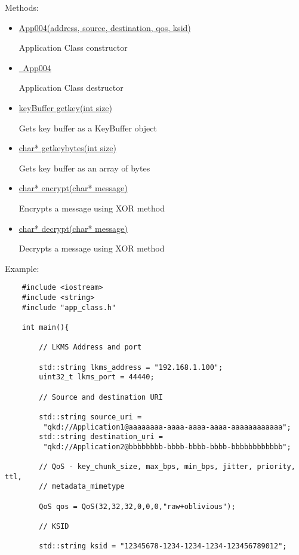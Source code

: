 \begin{refsection}
\begin{itemize}
		Methods:
		\begin{itemize}
			
			\item\underline{App004(address, source, destination, qos, ksid)}
		
				Application Class constructor	
		
			\item\underline{~App004}
		
				Application Class destructor
		
			\item\underline{keyBuffer get\textunderscore key(int size)}
		
				Gets key buffer as a KeyBuffer object
		
			\item\underline{char* get\textunderscore key\textunderscore bytes(int size)}
		
				Gets key buffer as an array of bytes
		
			\item\underline{char* encrypt(char* message)}
		
				Encrypts a message using XOR method
		
			\item\underline{char* decrypt(char* message)}
		
				Decrypts a message using XOR method
		
	\end{itemize}

	Example: 
	\begin{verbatim}
	#include <iostream>
	#include <string>
	#include "app_class.h"
	
	int main(){
		
		// LKMS Address and port
		
		std::string lkms_address = "192.168.1.100";
		uint32_t lkms_port = 44440;
		
		// Source and destination URI
		
		std::string source_uri =
		 "qkd://Application1@aaaaaaaa-aaaa-aaaa-aaaa-aaaaaaaaaaaa";
		std::string destination_uri =
		 "qkd://Application2@bbbbbbbb-bbbb-bbbb-bbbb-bbbbbbbbbbbb";
		
		// QoS - key_chunk_size, max_bps, min_bps, jitter, priority, ttl,
		// metadata_mimetype
		
		QoS qos = QoS(32,32,32,0,0,0,"raw+oblivious");
		
		// KSID
		
		std::string ksid = "12345678-1234-1234-1234-123456789012";
		

\end{verbatim}
\end{itemize}
\end{refsection}
